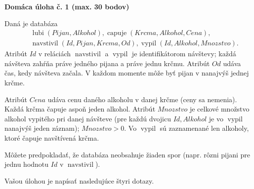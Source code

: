 \documentclass[10pt, a4paper]{article}
\DeclareMathOperator{\lubi}{lubi}
\DeclareMathOperator{\capuje}{capuje}
\DeclareMathOperator{\navstivil}{navstivil}
\DeclareMathOperator{\vypil}{vypil}
\begin{document}

\addtolength{\parskip}{0.5\baselineskip}

\pagestyle{empty}


\centerline{\bf\large Domáca úloha č. 1 (max. 30 bodov)}

\bigskip

\noindent Daná je databáza
\begin{eqnarray*}
& & \lubi(Pijan, Alkohol), \capuje(Krcma, Alkohol, Cena),\\
& & \navstivil(Id, Pijan, Krcma, Od), \vypil(Id, Alkohol, Mnozstvo).
\end{eqnarray*}
Atribút $Id$ v reláciách $\navstivil$ a $\vypil$ je identifikátorom návštevy; každá návšteva zahŕňa práve jedného pijana a práve jednu krčmu. Atribút $Od$ udáva čas, kedy návšteva začala. V každom momente môže byť pijan v nanajvýš jednej krčme. 

Atribút $Cena$ udáva cenu daného alkoholu v danej krčme (ceny sa nemenia). Každá krčma čapuje aspoň jeden alkohol.
Atribút $Mnozstvo$ je celkové množstvo alkohol vypitého pri danej návšteve (pre každú dvojicu $Id, Alkohol$ je vo $\vypil$ nanajvýš jeden záznam); $Mnozstvo > 0$. Vo $\vypil$ sú zaznamenané len alkoholy, ktoré čapuje navštívená krčma.

Môžete predpokladať, že databáza neobsahuje žiaden spor (napr. rôzni pijani pre jednu hodnotu $Id$ v $\navstivil$).

\noindent Vašou úlohou je napísať nasledujúce štyri dotazy.
\end{document}
